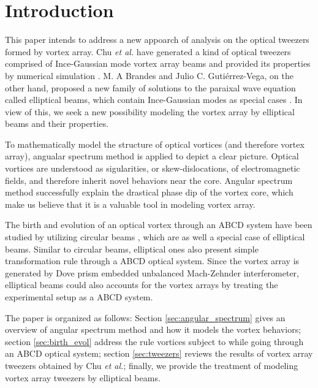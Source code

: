 \section{Introduction}
This paper intends to address a new appoarch of analysis on the optical tweezers formed by vortex array. Chu {\em et al.} have generated a kind of optical tweezers comprised of Ince-Gaussian mode vortex array beams and provided its properties by numerical simulation \cite{SCC08} \cite{Kuo_2013}. M. A Brandes and Julio C. Guti\'{e}rrez-Vega, on the other hand, proposed a new family of solutions to the paraixal wave equation called elliptical beams, which contain Ince-Gaussian modes as special cases \cite{Ban08EB}. In view of this, we seek a new possibility modeling the vortex array by elliptical beams and their properties.

To mathematically model the structure of optical vortices (and therefore vortex array), angualar spectrum method is applied to depict a clear picture. Optical vortices are understood as sigularities, or skew-dislocations, of electromagnetic fields, and therefore inherit novel behaviors near the core. Angular spectrum method successfully explain the drastical phase dip of the vortex core, which make us believe that it is a valuable tool in modeling vortex array. 

The birth and evolution of an optical vortex through an ABCD system have been studied by utilizing circular beams \cite{ValBE16}, which are as well a special case of elliptical beams. Similar to circular beams, elliptical ones also present simple transformation rule through a ABCD optical system. Since the vortex array is generated by Dove prism embedded unbalanced Mach-Zehnder interferometer, elliptical beams could also accounts for the vortex arrays by treating the experimental setup as a ABCD system.

The paper is organized as follows: Section \ref{sec:angular_spectrum} gives an overview of angular spectrum method and how it models the vortex behaviors; section \ref{sec:birth_evol} address the rule vortices subject to while going through an ABCD optical system; section \ref{sec:tweezers} reviews the results of vortex array tweezers obtained by Chu {\em et al.}; finally, we provide the treatment of modeling vortex array tweezers by elliptical beams.
